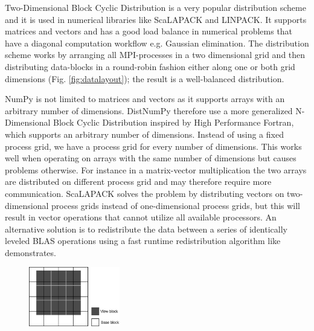 \documentclass[conference]{IEEEtran}
\begin{document}
Two-Dimensional Block Cyclic Distribution is a very popular distribution scheme and it is used in numerical libraries like ScaLAPACK\cite{Blackford96} and LINPACK\cite{linpack79}. It supports matrices and vectors and has a good load balance in numerical problems that have a diagonal computation workflow e.g. Gaussian elimination. The distribution scheme works by arranging all MPI-processes in a two dimensional grid and then distributing data-blocks in a round-robin fashion either along one or both grid dimensions (Fig. \ref {fig:datalayout}); the result is a well-balanced distribution.

NumPy is not limited to matrices and vectors as it supports arrays with an arbitrary number of dimensions. DistNumPy therefore use a more generalized N-Dimensional Block Cyclic Distribution inspired by High Performance Fortran\cite{Loveman93}, which supports an arbitrary number of dimensions. Instead of using a fixed process grid, we have a process grid for every number of dimensions. This works well when operating on arrays with the same number of dimensions but causes problems otherwise. For instance in a matrix-vector multiplication the two arrays are distributed on different process grid and may therefore require more communication. ScaLAPACK solves the problem by distributing vectors on two-dimensional process grids instead of one-dimensional process grids, but this will result in vector operations that cannot utilize all available processors. An alternative solution is to redistribute the data between a series of identically leveled BLAS operations using a fast runtime redistribution algorithm like \cite{PrylliT97} demonstrates.


\begin{figure}
 \centering
 \includegraphics[width=150px]{gfx/view_blocks}
 \caption{}
 \label{fig:view_block}
\end{figure}








\end{document}
